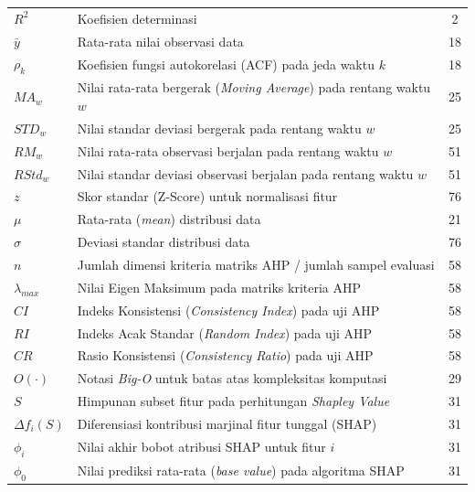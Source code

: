 \begin{longtable}{@{} l >{\raggedright\arraybackslash}p{6.5cm} c @{}}

$R^2$ & Koefisien determinasi & 2 \\
$\bar{y}$ & Rata-rata nilai observasi data & 18 \\
$\rho_k$ & Koefisien fungsi autokorelasi (ACF) pada jeda waktu $k$ & 18 \\
$MA_w$ & Nilai rata-rata bergerak (\textit{Moving Average}) pada rentang waktu $w$ & 25 \\
$STD_w$ & Nilai standar deviasi bergerak pada rentang waktu $w$ & 25 \\
$RM_w$ & Nilai rata-rata observasi berjalan pada rentang waktu $w$ & 51 \\
$RStd_w$ & Nilai standar deviasi observasi berjalan pada rentang waktu $w$ & 51 \\
$z$ & Skor standar (Z-Score) untuk normalisasi fitur & 76 \\
$\mu$ & Rata-rata (\textit{mean}) distribusi data & 21 \\
$\sigma$ & Deviasi standar distribusi data & 76 \\
$n$ & Jumlah dimensi kriteria matriks AHP / jumlah sampel evaluasi & 58 \\
$\lambda_{max}$ & Nilai Eigen Maksimum pada matriks kriteria AHP & 58 \\
$CI$ & Indeks Konsistensi (\textit{Consistency Index}) pada uji AHP & 58 \\
$RI$ & Indeks Acak Standar (\textit{Random Index}) pada uji AHP & 58 \\
$CR$ & Rasio Konsistensi (\textit{Consistency Ratio}) pada uji AHP & 58 \\[1ex]


$O(\cdot)$ & Notasi \textit{Big-O} untuk batas atas kompleksitas komputasi & 29 \\
$S$ & Himpunan subset fitur pada perhitungan \textit{Shapley Value} & 31 \\
$\Delta f_i(S)$ & Diferensiasi kontribusi marjinal fitur tunggal (SHAP) & 31 \\
$\phi_i$ & Nilai akhir bobot atribusi SHAP untuk fitur $i$ & 31 \\
$\phi_0$ & Nilai prediksi rata-rata (\textit{base value}) pada algoritma SHAP & 31 \\

\end{longtable}